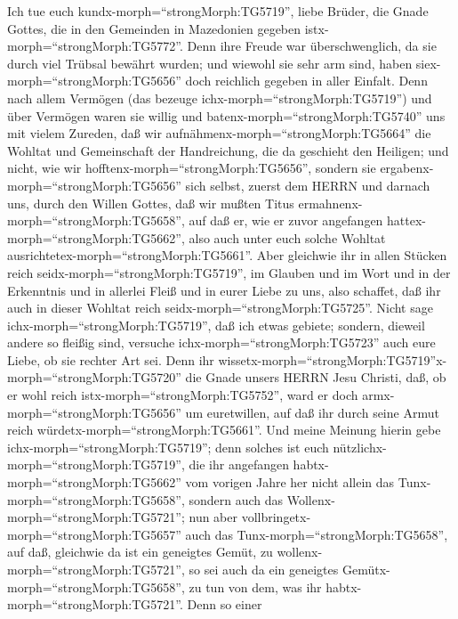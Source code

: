  Ich tue euch kundx-morph=``strongMorph:TG5719'', liebe
Brüder, die Gnade Gottes, die in den Gemeinden in Mazedonien gegeben
istx-morph=``strongMorph:TG5772''.  Denn ihre Freude war
überschwenglich, da sie durch viel Trübsal bewährt wurden; und wiewohl
sie sehr arm sind, haben siex-morph=``strongMorph:TG5656'' doch
reichlich gegeben in aller Einfalt.  Denn nach allem
Vermögen (das bezeuge ichx-morph=``strongMorph:TG5719'') und über
Vermögen waren sie willig  und
batenx-morph=``strongMorph:TG5740'' uns mit vielem Zureden, daß wir
aufnähmenx-morph=``strongMorph:TG5664'' die Wohltat und Gemeinschaft der
Handreichung, die da geschieht den Heiligen;  und nicht, wie
wir hofftenx-morph=``strongMorph:TG5656'', sondern sie
ergabenx-morph=``strongMorph:TG5656'' sich selbst, zuerst dem HERRN und
darnach uns, durch den Willen Gottes,  daß wir mußten Titus
ermahnenx-morph=``strongMorph:TG5658'', auf daß er, wie er zuvor
angefangen hattex-morph=``strongMorph:TG5662'', also auch unter euch
solche Wohltat ausrichtetex-morph=``strongMorph:TG5661''. 
Aber gleichwie ihr in allen Stücken reich
seidx-morph=``strongMorph:TG5719'', im Glauben und im Wort und in der
Erkenntnis und in allerlei Fleiß und in eurer Liebe zu uns, also
schaffet, daß ihr auch in dieser Wohltat reich
seidx-morph=``strongMorph:TG5725''.  Nicht sage
ichx-morph=``strongMorph:TG5719'', daß ich etwas gebiete; sondern,
dieweil andere so fleißig sind, versuche
ichx-morph=``strongMorph:TG5723'' auch eure Liebe, ob sie rechter Art
sei.  Denn ihr
wissetx-morph=``strongMorph:TG5719''\textbar x-morph=``strongMorph:TG5720''
die Gnade unsers HERRN Jesu Christi, daß, ob er wohl reich
istx-morph=``strongMorph:TG5752'', ward er doch
armx-morph=``strongMorph:TG5656'' um euretwillen, auf daß ihr durch
seine Armut reich würdetx-morph=``strongMorph:TG5661''. 
Und meine Meinung hierin gebe ichx-morph=``strongMorph:TG5719''; denn
solches ist euch nützlichx-morph=``strongMorph:TG5719'', die ihr
angefangen habtx-morph=``strongMorph:TG5662'' vom vorigen Jahre her
nicht allein das Tunx-morph=``strongMorph:TG5658'', sondern auch das
Wollenx-morph=``strongMorph:TG5721'';  nun aber
vollbringetx-morph=``strongMorph:TG5657'' auch das
Tunx-morph=``strongMorph:TG5658'', auf daß, gleichwie da ist ein
geneigtes Gemüt, zu wollenx-morph=``strongMorph:TG5721'', so sei auch da
ein geneigtes Gemütx-morph=``strongMorph:TG5658'', zu tun von dem, was
ihr habtx-morph=``strongMorph:TG5721''.  Denn so einer
